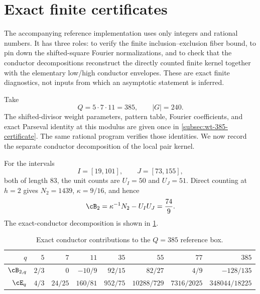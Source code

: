 \section{Exact finite certificates}\label{sec:certificates}

The accompanying reference implementation uses only integers and rational numbers.  It has three roles: to verify the finite inclusion--exclusion fiber bound, to pin down the shifted-square Fourier normalizations, and to check that the conductor decompositions reconstruct the directly counted finite kernel together with the elementary low/high conductor envelopes.  These are exact finite diagnostics, not inputs from which an asymptotic statement is inferred.

Take
\begin{equation}\label{eq:Q385-definition}
 Q=5\cdot7\cdot11=385,
 \qquad |G|=240.
\end{equation}
The shifted-divisor weight parameters, pattern table, Fourier coefficients,
and exact Parseval identity at this modulus are given once in
\cref{subsec:wt-385-certificate}.  The same rational program verifies those
identities.  We now record the separate conductor decomposition of the local
pair kernel.

For the intervals
\begin{equation}\label{eq:Q385-reference-intervals}
 I=[19,101],
 \qquad
 J=[73,155],
\end{equation}
both of length $83$, the unit counts are $U_I=50$ and $U_J=51$.  Direct counting at $h=2$ gives $N_2=1439$, $\kappa=9/16$, and hence
\begin{equation}\label{eq:Q385-fixed-box-value}
 \cB_2=\kappa^{-1}N_2-U_IU_J=\frac{74}{9}.
\end{equation}
The exact-conductor decomposition is shown in \cref{tab:Q385-fixed-supports}.

\begin{table}[ht]
\centering
\caption{Exact conductor contributions to the $Q=385$ reference box.}
\label{tab:Q385-fixed-supports}
\begin{tabular}{@{}rrrrrrrr@{}}
\toprule
$q$ & $5$ & $7$ & $11$ & $35$ & $55$ & $77$ & $385$\\
\midrule
$\cB_{2,q}$
& $2/3$ & $0$ & $-10/9$ & $92/15$ & $82/27$ & $4/9$ & $-128/135$\\
$\cE_q$
& $4/3$ & $24/25$ & $160/81$ & $952/75$ & $10288/729$ & $7316/2025$ & $348044/18225$\\
\bottomrule
\end{tabular}
\end{table}

